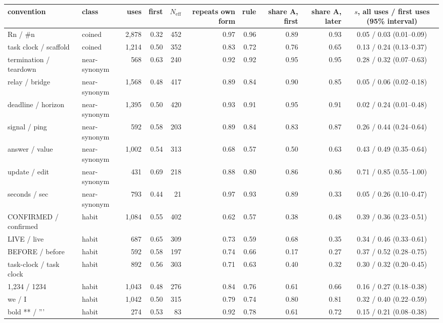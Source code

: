\begin{tabular}{llrrrrrrrc}
\toprule
convention & class & uses & first & $N_\mathrm{eff}$ & repeats own form & rule & share A, first & share A, later & $s$, all uses / first uses (95\% interval) \\
\midrule
Rn / \#n & coined & 2,878 & 0.32 & 452 & 0.97 & 0.96 & 0.89 & 0.93 & 0.05 / 0.03 (0.01--0.09) \\
task clock / scaffold & coined & 1,214 & 0.50 & 352 & 0.83 & 0.72 & 0.76 & 0.65 & 0.13 / 0.24 (0.13--0.37) \\
termination / teardown & near-synonym & 568 & 0.63 & 240 & 0.92 & 0.92 & 0.95 & 0.95 & 0.28 / 0.32 (0.07--0.63) \\
relay / bridge & near-synonym & 1,568 & 0.48 & 417 & 0.89 & 0.84 & 0.90 & 0.85 & 0.05 / 0.06 (0.02--0.18) \\
deadline / horizon & near-synonym & 1,395 & 0.50 & 420 & 0.93 & 0.91 & 0.95 & 0.91 & 0.02 / 0.24 (0.01--0.48) \\
signal / ping & near-synonym & 592 & 0.58 & 203 & 0.89 & 0.84 & 0.83 & 0.87 & 0.26 / 0.44 (0.24--0.64) \\
answer / value & near-synonym & 1,002 & 0.54 & 313 & 0.68 & 0.57 & 0.50 & 0.63 & 0.43 / 0.49 (0.35--0.64) \\
update / edit & near-synonym & 431 & 0.69 & 218 & 0.88 & 0.80 & 0.86 & 0.86 & 0.71 / 0.85 (0.55--1.00) \\
seconds / sec & near-synonym & 793 & 0.44 & 21 & 0.97 & 0.93 & 0.89 & 0.33 & 0.05 / 0.26 (0.10--0.47) \\
CONFIRMED / confirmed & habit & 1,084 & 0.55 & 402 & 0.62 & 0.57 & 0.38 & 0.48 & 0.39 / 0.36 (0.23--0.51) \\
LIVE / live & habit & 687 & 0.65 & 309 & 0.73 & 0.59 & 0.68 & 0.35 & 0.34 / 0.46 (0.33--0.61) \\
BEFORE / before & habit & 592 & 0.58 & 197 & 0.74 & 0.66 & 0.17 & 0.27 & 0.37 / 0.52 (0.28--0.75) \\
task-clock / task clock & habit & 892 & 0.56 & 303 & 0.71 & 0.63 & 0.40 & 0.32 & 0.30 / 0.32 (0.20--0.45) \\
1,234 / 1234 & habit & 1,043 & 0.48 & 276 & 0.84 & 0.76 & 0.61 & 0.66 & 0.16 / 0.27 (0.18--0.38) \\
we / I & habit & 1,042 & 0.50 & 315 & 0.79 & 0.74 & 0.80 & 0.81 & 0.32 / 0.40 (0.22--0.59) \\
bold ** / ''' & habit & 274 & 0.53 & 83 & 0.92 & 0.78 & 0.61 & 0.72 & 0.15 / 0.21 (0.08--0.38) \\
\bottomrule
\end{tabular}
